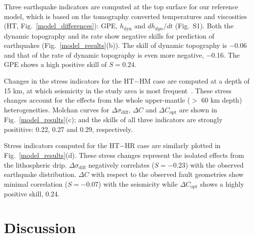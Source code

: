 \documentclass[draft,linenumbers]{agujournal2018}
\begin{document}
Three earthquake indicators are computed at the top surface for our reference model, which is based on the tomography converted temperatures and viscosities (HT, Fig.~\ref{model_differences}): GPE, $h_{\text{dyn}}$ and $dh_{dyn}/dt$ (Fig.~S1).
Both the dynamic topography and its rate show negative skills for prediction of earthquakes (Fig.~\ref{model_results}(b)). The skill of dynamic topography is $-$0.06 and that of the rate of dynamic topography is even more negative, $-$0.16.
The GPE shows a high positive skill of $S=0.24$.

Changes in the stress indicators for the HT$-$HM case are computed at a depth of 15 km, at which seismicity in the study area is most frequent~\citep[e.g.,][]{mazzotti2010state}. These stress changes account for the effects from the whole upper-mantle  ($>$ 60 km depth) heterogeneities. Molchan curves for $\Delta \sigma_{\text{diff}}$, $\Delta C$ and $\Delta C_{\text{opt}}$ are shown in Fig.~\ref{model_results}(c); and the skills of all three indicators are strongly posititive: 0.22, 0.27 and 0.29, respectively. 

Stress indicators computed for the HT$-$HR case are similarly plotted in Fig.~\ref{model_results}(d). These stress changes represent the isolated effects from the lithospheric drip. $\Delta \sigma_{\text{diff}}$ negatively correlates ($S=-0.23$) with the observed earthquake distribution. $\Delta C$ with respect to the observed fault geometries show minimal correlation ($S=-0.07$) with the seismicity while $\Delta C_{\text{opt}}$ shows a highly positive skill, 0.24.
%
\section{Discussion}
\end{document}
